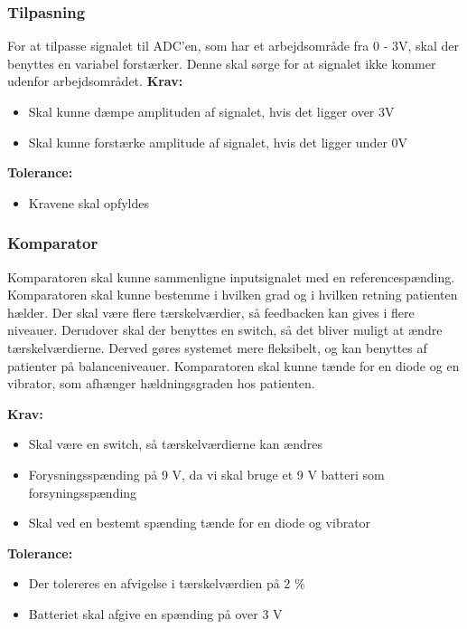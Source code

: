 \subsubsection{Tilpasning}
For at tilpasse signalet til ADC'en, som har et arbejdsområde fra 0 - 3V, skal der benyttes en variabel forstærker. Denne skal sørge for at signalet ikke kommer udenfor arbejdsområdet.
\textbf{Krav:}
\begin{itemize}
\item Skal kunne dæmpe amplituden af signalet, hvis det ligger over 3V
\item Skal kunne forstærke amplitude af signalet, hvis det ligger under 0V
\end{itemize}

\textbf{Tolerance:}
\begin{itemize}
\item Kravene skal opfyldes
\end{itemize}

\subsubsection{Komparator}
Komparatoren skal kunne sammenligne inputsignalet med en referencespænding. Komparatoren skal kunne bestemme i hvilken grad og i hvilken retning patienten hælder. Der skal være flere tærskelværdier, så feedbacken kan gives i flere niveauer. Derudover skal der benyttes en switch, så det bliver muligt at ændre tærskelværdierne. Derved gøres systemet mere fleksibelt, og kan benyttes af patienter på balanceniveauer. Komparatoren skal kunne tænde for en diode og en vibrator, som afhænger hældningsgraden hos patienten. 

\textbf{Krav:}
\begin{itemize}
\item Skal være en switch, så tærskelværdierne kan ændres
\item Forysningsspænding på 9 V, da vi skal bruge et 9 V batteri som forsyningsspænding
\item Skal ved en bestemt spænding tænde for en diode og vibrator
\end{itemize}

\textbf{Tolerance:}
\begin{itemize}
\item Der tolereres en afvigelse i tærskelværdien på 2 \%
\item Batteriet skal afgive en spænding på over 3 V
\end{itemize}

